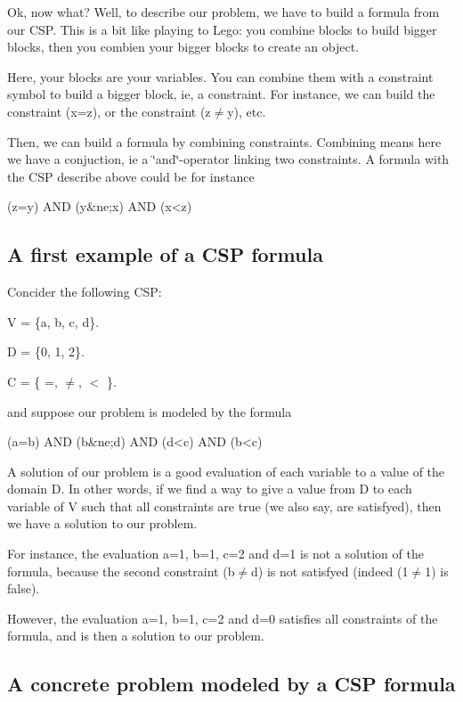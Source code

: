 Ok, now what? Well, to describe our problem, we have to build a formula from our C\-S\-P. This is a bit like playing to Lego\-: you combine blocks to build bigger blocks, then you combien your bigger blocks to create an object.

Here, your blocks are your variables. You can combine them with a constraint symbol to build a bigger block, ie, a constraint. For instance, we can build the constraint (x=z), or the constraint (z{$\ne$}y), etc.

Then, we can build a formula by combining constraints. Combining means here we have a conjuction, ie a \char`\"{}and\char`\"{}-\/operator linking two constraints. A formula with the C\-S\-P describe above could be for instance \begin{DoxyVerb}            (z=y) AND (y&ne;x) AND (x<z) 
\end{DoxyVerb}


\subsection*{A first example of a C\-S\-P formula }

Concider the following C\-S\-P\-:


\begin{DoxyItemize}
\item V = \{a, b, c, d\}.
\item D = \{0, 1, 2\}.
\item C = \{ =, {$\ne$}, $<$ \}.
\end{DoxyItemize}

and suppose our problem is modeled by the formula \begin{DoxyVerb}                (a=b) AND (b&ne;d) AND (d<c) AND (b<c)
\end{DoxyVerb}


A solution of our problem is a good evaluation of each variable to a value of the domain D. In other words, if we find a way to give a value from D to each variable of V such that all constraints are true (we also say, are satisfyed), then we have a solution to our problem.

For instance, the evaluation a=1, b=1, c=2 and d=1 is not a solution of the formula, because the second constraint (b{$\ne$}d) is not satisfyed (indeed (1{$\ne$}1) is false).

However, the evaluation a=1, b=1, c=2 and d=0 satisfies all constraints of the formula, and is then a solution to our problem.

\subsection*{A concrete problem modeled by a C\-S\-P formula }

